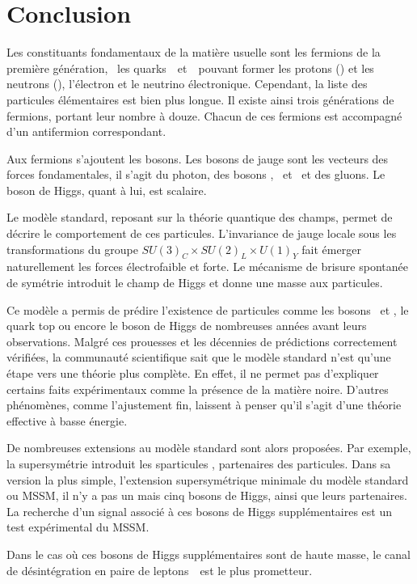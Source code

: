 \section{Conclusion}\label{chapter-MS-MSSM-section-conclusion}
Les constituants fondamentaux de la matière usuelle sont les fermions de la première génération, \ie\ les quarks~\quarku\ et~\quarkd\ pouvant former les protons (\quarku\quarku\quarkd) et les neutrons (\quarku\quarkd\quarkd), l'électron et le neutrino électronique.
Cependant, la liste des particules élémentaires est bien plus longue.
Il existe ainsi trois générations de fermions, portant leur nombre à douze.
Chacun de ces fermions est accompagné d'un antifermion correspondant.
\par Aux fermions s'ajoutent les bosons.
Les bosons de jauge sont les vecteurs des forces fondamentales, il s'agit du photon, des bosons \Wbosonplus, \Wbosonminus\ et \Zboson\ et des gluons.
Le boson de Higgs, quant à lui, est scalaire.
\par Le modèle standard, reposant sur la théorie quantique des champs, permet de décrire le comportement de ces particules.
L'invariance de jauge locale sous les transformations du groupe $SU(3)_C \times SU(2)_L \times U(1)_Y$ fait émerger naturellement les forces électrofaible et forte.
Le mécanisme de brisure spontanée de symétrie introduit le champ de Higgs et donne une masse aux particules.
\par Ce modèle a permis de prédire l'existence de particules comme les bosons \Wboson\ et \Zboson, le quark top ou encore le boson de Higgs de nombreuses années avant leurs observations.
Malgré ces prouesses et les décennies de prédictions correctement vérifiées, la communauté scientifique sait que le modèle standard n'est qu'une étape vers une théorie plus complète.
En effet, il ne permet pas d'expliquer certains faits expérimentaux comme la présence de la matière noire.
D'autres phénomènes, comme l'ajustement fin, laissent à penser qu'il s'agit d'une théorie effective à basse énergie.
\par De nombreuses extensions au modèle standard sont alors proposées.
Par exemple, la supersymétrie
introduit les \og sparticules \fg, partenaires des particules.
Dans sa version la plus simple, l'extension supersymétrique minimale du modèle standard ou MSSM, il n'y a pas un mais cinq bosons de Higgs, ainsi que leurs partenaires.
La recherche d'un signal associé à ces bosons de Higgs supplémentaires est un test expérimental du MSSM.
\par Dans le cas où ces bosons de Higgs supplémentaires sont de haute masse, le canal de désintégration en paire de leptons~\tau\ est le plus prometteur.
